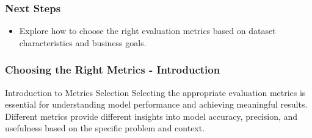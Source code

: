\documentclass[aspectratio=169]{beamer}
\begin{document}
\begin{frame}[fragile]
    \frametitle{Next Steps}
    \begin{itemize}
        \item Explore how to choose the right evaluation metrics based on dataset characteristics and business goals.
    \end{itemize}
\end{frame}

\begin{frame}[fragile]
    \frametitle{Choosing the Right Metrics - Introduction}
    \begin{block}{Introduction to Metrics Selection}
        Selecting the appropriate evaluation metrics is essential for understanding model performance and achieving meaningful results. Different metrics provide different insights into model accuracy, precision, and usefulness based on the specific problem and context.
    \end{block}
\end{frame}
\end{document}
